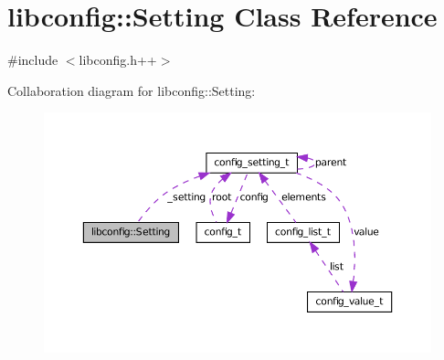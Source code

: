 \hypertarget{classlibconfig_1_1_setting}{
\section{libconfig::Setting Class Reference}
\label{classlibconfig_1_1_setting}
}


{\ttfamily \#include $<$libconfig.h++$>$}



Collaboration diagram for libconfig::Setting:
\nopagebreak
\begin{figure}[H]
\begin{center}
\leavevmode
\includegraphics[width=391pt]{classlibconfig_1_1_setting__coll__graph}
\end{center}
\end{figure}
